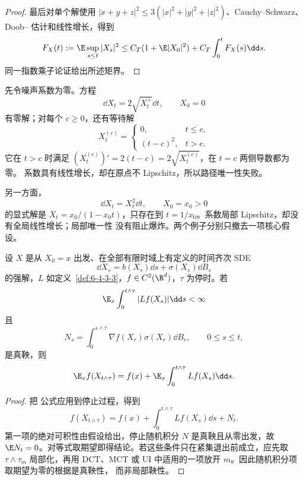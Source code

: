 \begin{proof}
最后对单个解使用
$|x+y+z|^2\le3(|x|^2+|y|^2+|z|^2)$、Cauchy--Schwarz、Doob--\Ito{} 估计和线性增长，得到
\[
 F_X(t):=\E\sup_{s\le t}|X_s|^2
 \le C_T(1+\E|X_0|^2)+C_T\int_0^tF_X(s)\dd s.
\]
同一指数乘子论证给出所述矩界。
\end{proof}

\begin{example}\label{ex:6-4-3-4}
先令噪声系数为零。方程
\[
 \dd X_t=2\sqrt{X_t^+}\dd t,
 \qquad X_0=0
\]
有零解；对每个 $c\ge0$，还有等待解
\[
 X_t^{(c)}=
 \begin{cases}
 0,&t\le c,\\
 (t-c)^2,&t>c.
 \end{cases}
\]
它在 $t>c$ 时满足
$(X_t^{(c)})'=2(t-c)=2\sqrt{X_t^{(c)}}$，在 $t=c$ 两侧导数都为零。
系数具有线性增长，却在原点不 Lipschitz，所以路径唯一性失败。

另一方面，
\[
 \dd X_t=X_t^2\dd t,
 \qquad X_0=x_0>0
\]
的显式解是
$X_t=x_0/(1-x_0t)$，只存在到 $t=1/x_0$。系数局部 Lipschitz，却没有全局线性增长；局部唯一性
没有阻止爆炸。两个例子分别只撤去一项核心假设。
\end{example}

\begin{proposition}[Dynkin 公式]\label{proposition:6-4-3-3}
设 $X$ 是从 $X_0=x$ 出发、在全部有限时域上有定义的时间齐次 SDE
\[
 \dd X_s=b(X_s)\dd s+\sigma(X_s)\dd B_s
\]
的强解，$L$ 如定义~\ref{def:6-4-3-3}，$f\in C^2(\R^d)$，$\tau$ 为停时。若
\[
 \E_x\int_0^{t\wedge\tau}|Lf(X_s)|\dd s<\infty
\]
且
\[
 N_s=\int_0^{s\wedge\tau}\nabla f(X_r)\sigma(X_r)\dd B_r,
 \qquad 0\le s\le t,
\]
是真鞅，则
\[
 \E_x f(X_{t\wedge\tau})
 =f(x)+\E_x\int_0^{t\wedge\tau}Lf(X_s)\dd s.
\]
\end{proposition}

\begin{proof}
把 \Ito{} 公式应用到停止过程，得到
\[
 f(X_{t\wedge\tau})=f(x)+\int_0^{t\wedge\tau}Lf(X_s)\dd s+N_t.
\]
第一项的绝对可积性由假设给出，停止随机积分 $N$ 是真鞅且从零出发，故
$\E N_t=0$。对等式取期望即得结论。若这些条件只在紧集退出前成立，应先取
$\tau\wedge\tau_m$ 局部化，再用 DCT、MCT 或 UI 中适用的一项放开 $m$。因此随机积分项取期望为零的根据是真鞅性，
而非局部鞅性。
\end{proof}


